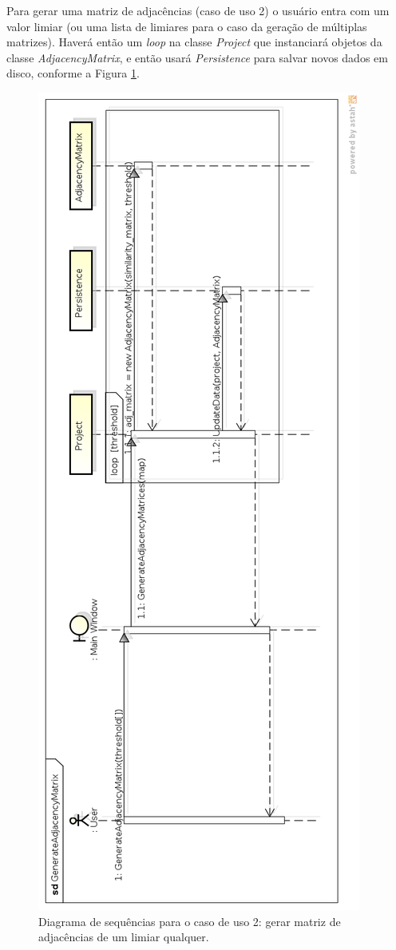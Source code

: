Para gerar uma matriz de adjacências (caso de uso 2)
o usuário entra com um valor limiar (ou uma lista de limiares para o caso da geração de múltiplas matrizes). Haverá
então um \textit{loop} na classe \textit{Project} que instanciará objetos da classe \textit{AdjacencyMatrix}, e então usará \textit{Persistence} para salvar
novos dados em disco, conforme a Figura \ref{fig:generate-adjacency-matrix}.

\begin{figure}
\centering
\includegraphics[scale=0.42]{generate-adjacency-matrix}
\caption{Diagrama de sequências para o caso de uso 2: gerar matriz de adjacências de um limiar qualquer.}
\label{fig:generate-adjacency-matrix}
\end{figure}

